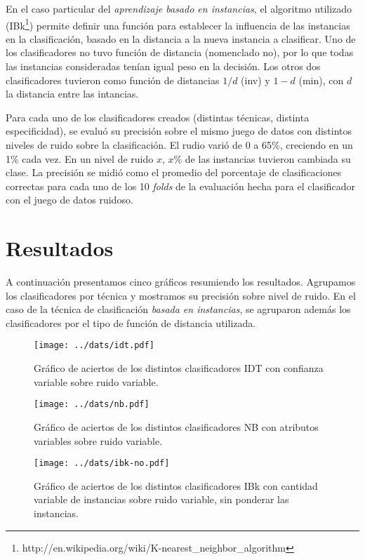 \documentclass[a4paper,10pt]{article}
\begin{document}
En el caso particular del \emph{aprendizaje basado en instancias}, el algoritmo utilizado (\textsf{IBk}\footnote{http://en.wikipedia.org/wiki/K-nearest\_neighbor\_algorithm}) permite definir una función para establecer la influencia de las instancias en la clasificación, basado en la distancia a la nueva instancia a clasificar. Uno de los clasificadores no tuvo función de distancia (nomenclado \textsf{no}), por lo que todas las instancias consideradas tenían igual peso en la decisión. Los otros dos clasificadores tuvieron como función de distancias $1/d$ (\textsf{inv}) y $1-d$ (\textsf{min}), con $d$ la distancia entre las intancias. 

Para cada uno de los clasificadores creados (distintas técnicas, distinta especificidad), se evaluó su precisión sobre el mismo juego de datos con distintos niveles de ruido sobre la clasificación. El rudio varió de 0 a 65\%, creciendo en un 1\% cada vez. En un nivel de ruido $x$, $x$\% de las instancias tuvieron cambiada su clase. La precisión se midió como el promedio del porcentaje de clasificaciones correctas para cada uno de los 10 \emph{folds} de la evaluación hecha para el clasificador con el juego de datos ruidoso.

\section{Resultados}

A continuación presentamos cinco gráficos resumiendo los resultados. Agrupamos los clasificadores por técnica y mostramos su precisión sobre nivel de ruido. En el caso de la técnica de clasificación \emph{basada en instancias}, se agruparon además los clasificadores por el tipo de función de distancia utilizada. 

\begin{figure}
\centering
\texttt{[image: ../dats/idt.pdf]}
\caption{Gráfico de aciertos de los distintos clasificadores \textsf{IDT} con confianza variable sobre ruido variable.}
\end{figure}

\begin{figure}
\centering
\texttt{[image: ../dats/nb.pdf]}
\caption{Gráfico de aciertos de los distintos clasificadores \textsf{NB} con atributos variables sobre ruido variable.}
\end{figure}

\begin{figure}
\centering
\texttt{[image: ../dats/ibk-no.pdf]}
\caption{Gráfico de aciertos de los distintos clasificadores \textsf{IBk} con cantidad variable de instancias sobre ruido variable, sin ponderar las instancias.}
\end{figure}
\end{document}
